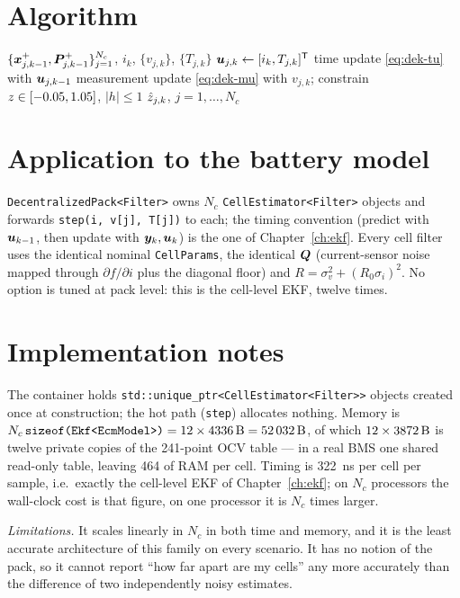 \section{Algorithm}
\begin{algorithm}[H]
\caption{Decentralized-EKF --- one sampling period $k$}
\begin{algorithmic}[1]
\Require $\{\bm{x}^+_{j,k-1},\bm{P}^{+}_{j,k-1}\}_{j=1}^{N_c}$, $i_k$, $\{v_{j,k}\}$, $\{T_{j,k}\}$
  \State $\bm{u}_{j,k}\gets[i_k,T_{j,k}]^{\mathsf{T}}$
  \State time update \eqref{eq:dek-tu} with $\bm{u}_{j,k-1}$
  \State measurement update \eqref{eq:dek-mu} with $v_{j,k}$; constrain $z\in[-0.05,1.05]$, $|h|\le1$
\EndFor
\Ensure $\hat{z}_{j,k}$, $j=1,\dots,N_c$
\end{algorithmic}
\end{algorithm}

\section{Application to the battery model}
\texttt{DecentralizedPack<Filter>} owns $N_c$ \texttt{CellEstimator<Filter>} objects and forwards
\texttt{step(i, v[j], T[j])} to each; the timing convention (predict with $\bm{u}_{k-1}$, then update
with $\bm{y}_k,\bm{u}_k$) is the one of Chapter~\ref{ch:ekf}. Every cell filter uses the identical
nominal \texttt{CellParams}, the identical $\bm{Q}$ (current-sensor noise mapped through $\partial
f/\partial i$ plus the diagonal floor) and $R=\sigma_v^2+(R_0\sigma_i)^2$. No option is tuned at
pack level: this is the cell-level EKF, twelve times.

\section{Implementation notes}
The container holds \texttt{std::unique\_ptr<CellEstimator<Filter>>} objects created once at
construction; the hot path (\texttt{step}) allocates nothing. Memory is
$N_c\,\texttt{sizeof(Ekf<EcmModel>)} = 12\times\SI{4336}{\byte} = \SI{52032}{\byte}$, of which
$12\times\SI{3872}{\byte}$ is twelve private copies of the 241-point OCV table --- in a real BMS
one shared read-only table, leaving \SI{464}{\byte} of RAM per cell. Timing is
\SI{322}{\nano\second} per cell per sample, i.e.\ exactly the cell-level EKF of
Chapter~\ref{ch:ekf}; on $N_c$ processors the wall-clock cost is that figure, on one processor it
is $N_c$ times larger.

\emph{Limitations.} It scales linearly in $N_c$ in both time and memory, and it is the least
accurate architecture of this family on every scenario. It has no notion of the pack, so it
cannot report ``how far apart are my cells'' any more accurately than the difference of two
independently noisy estimates.

